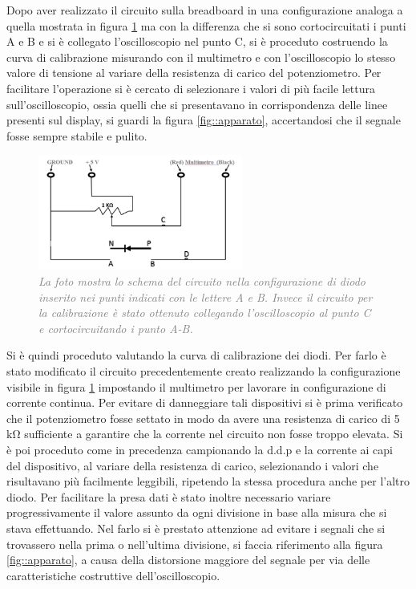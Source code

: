 \documentclass[a4paper,11pt]{article}
\begin{document}
    Dopo aver realizzato il circuito sulla breadboard in una configurazione analoga a quella mostrata in figura \ref{fig::circuito} ma con la differenza che si sono cortocircuitati i punti A e B e si è collegato l'oscilloscopio nel punto C, si è proceduto costruendo la curva di calibrazione misurando con il multimetro e con l'oscilloscopio lo stesso valore di tensione al variare della resistenza di carico del potenziometro. Per facilitare l'operazione si è cercato di  selezionare i valori di più facile lettura sull'oscilloscopio, ossia quelli che si presentavano in corrispondenza delle linee presenti sul display, si guardi la figura \ref{fig::apparato}, accertandosi che il segnale fosse sempre stabile e pulito.
\begin{figure}
	\centering
	\includegraphics[width=0.6\textwidth]{pictures/circuito.png}	\caption{\textit{\textcolor{gray}{La foto mostra lo schema del circuito nella configurazione di diodo inserito nei punti indicati con le lettere A e B. Invece il circuito per la calibrazione è stato ottenuto collegando
    l'oscilloscopio al punto C e cortocircuitando i punto A-B.}}}
    \label{fig::circuito}
\end{figure}
Si è quindi proceduto valutando la curva di calibrazione dei diodi. Per farlo è stato modificato il circuito precedentemente creato realizzando la configurazione visibile in figura \ref{fig::circuito} impostando il multimetro per lavorare in configurazione di corrente continua. Per evitare di danneggiare tali dispositivi si è prima verificato che il potenziometro fosse settato in modo da avere una resistenza di carico di 5 $\mathrm{k\Omega}$ sufficiente a garantire che la corrente nel circuito non fosse troppo elevata. Si è poi proceduto come in precedenza campionando la d.d.p e la corrente ai capi del dispositivo, al variare della resistenza di carico, selezionando i valori che risultavano più facilmente leggibili, ripetendo la stessa procedura anche per l'altro diodo. Per facilitare la presa dati è stato inoltre necessario variare progressivamente il valore assunto da ogni divisione in base alla misura che si stava effettuando. Nel farlo si è prestato attenzione ad evitare i segnali che si trovassero nella prima o nell'ultima divisione, si faccia riferimento alla figura \ref{fig::apparato}, a causa della distorsione maggiore del segnale per via delle caratteristiche costruttive dell'oscilloscopio.
\end{document}
